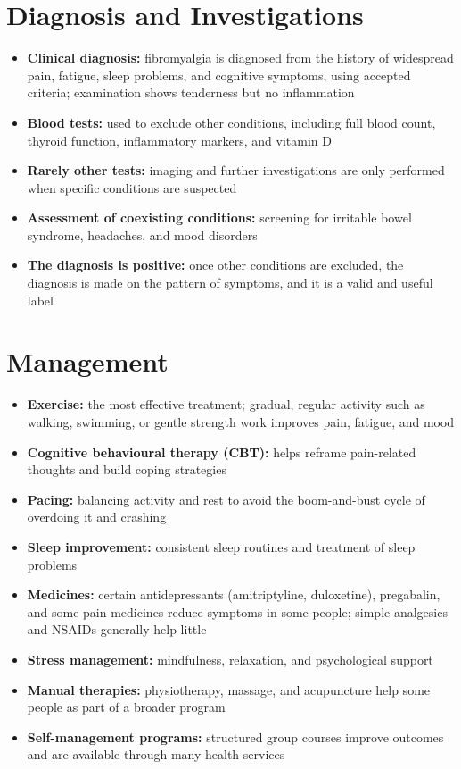 \section*{Diagnosis and Investigations}
\begin{itemize}
    \item \textbf{Clinical diagnosis:} fibromyalgia is diagnosed from the history of widespread pain, fatigue, sleep problems, and cognitive symptoms, using accepted criteria; examination shows tenderness but no inflammation
    \item \textbf{Blood tests:} used to exclude other conditions, including full blood count, thyroid function, inflammatory markers, and vitamin D
    \item \textbf{Rarely other tests:} imaging and further investigations are only performed when specific conditions are suspected
    \item \textbf{Assessment of coexisting conditions:} screening for irritable bowel syndrome, headaches, and mood disorders
    \item \textbf{The diagnosis is positive:} once other conditions are excluded, the diagnosis is made on the pattern of symptoms, and it is a valid and useful label
\end{itemize}

\section*{Management}
\begin{itemize}
    \item \textbf{Exercise:} the most effective treatment; gradual, regular activity such as walking, swimming, or gentle strength work improves pain, fatigue, and mood
    \item \textbf{Cognitive behavioural therapy (CBT):} helps reframe pain-related thoughts and build coping strategies
    \item \textbf{Pacing:} balancing activity and rest to avoid the boom-and-bust cycle of overdoing it and crashing
    \item \textbf{Sleep improvement:} consistent sleep routines and treatment of sleep problems
    \item \textbf{Medicines:} certain antidepressants (amitriptyline, duloxetine), pregabalin, and some pain medicines reduce symptoms in some people; simple analgesics and NSAIDs generally help little
    \item \textbf{Stress management:} mindfulness, relaxation, and psychological support
    \item \textbf{Manual therapies:} physiotherapy, massage, and acupuncture help some people as part of a broader program
    \item \textbf{Self-management programs:} structured group courses improve outcomes and are available through many health services
\end{itemize}

